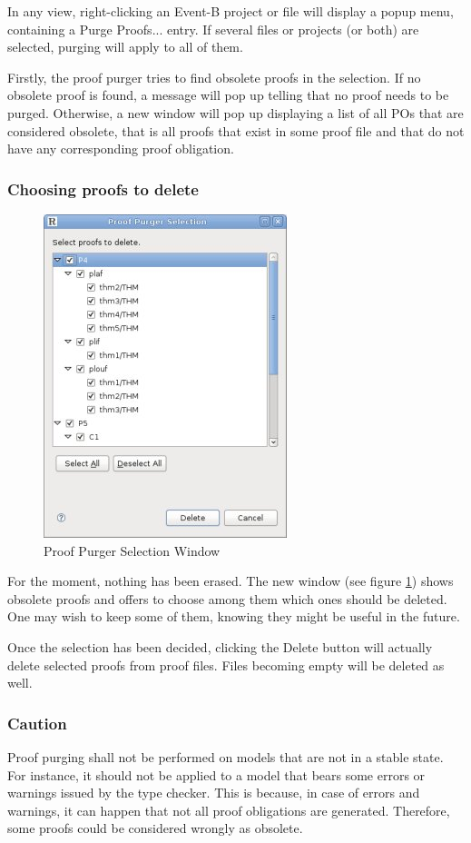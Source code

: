 In any view, right-clicking an Event-B project or file will display a popup menu, containing a Purge Proofs... entry. If several files or projects (or both) are selected, purging will apply to all of them.

Firstly, the proof purger tries to find obsolete proofs in the selection. If no obsolete proof is found, a message will pop up telling that no proof needs to be purged. Otherwise, a new window will pop up displaying a list of all POs that are considered obsolete, that is all proofs that exist in some proof file and that do not have any corresponding proof obligation. 

\subsubsection{Choosing proofs to delete}

\begin{figure}[!h]
\begin{center}
	\includegraphics{img/reference/ref_10_proof_purger.png}
	\caption{Proof Purger Selection Window}
	\label{fig_ref_10_proof_purger}
\end{center}
\end{figure}

For the moment, nothing has been erased. The new window (see figure \ref{fig_ref_10_proof_purger}) shows obsolete proofs and offers to choose among them which ones should be deleted. One may wish to keep some of them, knowing they might be useful in the future.

Once the selection has been decided, clicking the Delete button will actually delete selected proofs from proof files. Files becoming empty will be deleted as well.

\subsubsection{Caution}

Proof purging shall not be performed on models that are not in a stable state. For instance, it should not be applied to a model that bears some errors or warnings issued by the type checker. This is because, in case of errors and warnings, it can happen that not all proof obligations are generated. Therefore, some proofs could be considered wrongly as obsolete.

